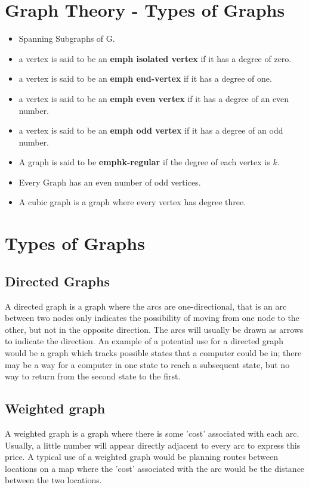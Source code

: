 \documentclass[]{report}
\begin{document}
\section{Graph Theory - Types of Graphs}

\begin{itemize}
\item Spanning Subgraphs of G.

\item a vertex is said to be an \textbf{emph{ isolated vertex}} if it has a degree of zero.
\item a vertex is said to be an \textbf{emph{ end-vertex}} if it has a degree of one.
\item a vertex is said to be an \textbf{emph{ even vertex}} if it has a degree of an even number.
\item a vertex is said to be an \textbf{emph{ odd vertex}} if it has a degree of an odd number.


\item A graph is said to be \textbf{emph{k-regular}} if the degree of each vertex is $k$. 
\item Every Graph has an even number of odd vertices.
\item A cubic graph is a graph where every vertex has degree three.
\end{itemize}
\newpage
\section{Types of Graphs}

\subsection{Directed Graphs}
A directed graph is a graph where the arcs are one-directional, that is an arc between two nodes only indicates the possibility of moving from one node to the other, but not in the opposite direction. The arcs will usually be drawn as arrows to indicate the direction. An example of a potential use for a directed graph would be a graph which tracks possible states that a computer could be in; there may be a way for a computer in one state to reach a subsequent state, but no way to return from the second state to the first.

\subsection{Weighted graph}
A weighted graph is a graph where there is some 'cost' associated with each arc. Usually, a little number will appear directly adjacent to every arc to express this price. A typical use of a weighted graph would be planning routes between locations on a map where the 'cost' associated with the arc would be the distance between the two locations.
\end{document}
